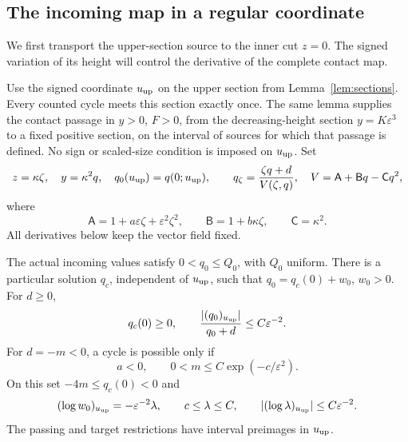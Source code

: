 \subsection{The incoming map in a regular coordinate}

We first transport the upper-section source to the inner cut $z=0$.
The signed variation of its height will control the derivative of the
complete contact map.

Use the signed coordinate $u_{\rm up}$ on the upper section from
Lemma~\ref{lem:sections}. Every counted cycle meets this section exactly
once.
The same lemma supplies the contact passage in $y>0$, $F>0$,
from the decreasing-height section $y=K\varepsilon^3$ to a fixed
positive section, on the interval of sources for which that passage is
defined. No sign or scaled-size condition is imposed on $u_{\rm up}$.
Set
\begin{equation}
\label{eq:pc-inner}
 z=\kappa\zeta,\quad y=\kappa^2q,\quad
 q_0(u_{\rm up})=q(0;u_{\rm up}),\qquad
 q_\zeta=\frac{\zeta q+d}{V(\zeta,q)},\quad
 V=\mathsf A+\mathsf Bq-\mathsf Cq^2,
\end{equation}
where
\[
 \mathsf A=1+a\varepsilon\zeta+\varepsilon^2\zeta^2,
 \qquad \mathsf B=1+b\kappa\zeta,\qquad \mathsf C=\kappa^2.
\]
All derivatives below keep the vector field fixed.

\begin{lemma}
\label{lem:pc-entry}
The actual incoming values satisfy $0<q_0\le Q_0$, with $Q_0$
uniform. There is a particular solution $q_c$, independent of
$u_{\rm up}$, such
that $q_0=q_c(0)+w_0$, $w_0>0$. For $d\ge0$,
\begin{equation}
\label{eq:pc-entry-positive}
 q_c(0)\ge0,\qquad
 \frac{|(q_0)_{u_{\rm up}}|}{q_0+d}\le C\varepsilon^{-2}.
\end{equation}
For $d=-m<0$, a cycle is possible only if
\begin{equation}
\label{eq:pc-exponential-wedge}
 a<0,\qquad 0<m\le C\exp(-c/\varepsilon^2).
\end{equation}
On this set $-4m\le q_c(0)<0$ and
\begin{equation}
\label{eq:pc-entry-negative}
 (\log w_0)_{u_{\rm up}}=-\varepsilon^{-2}\lambda,
 \qquad c\le\lambda\le C,\qquad
 |(\log\lambda)_{u_{\rm up}}|\le C\varepsilon^{-2}.
\end{equation}
The passing and target restrictions have interval preimages in
$u_{\rm up}$.
\end{lemma}

